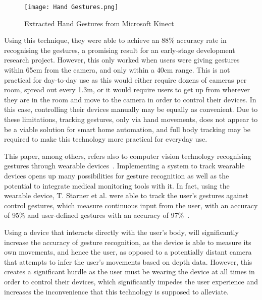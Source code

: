 \begin{figure}[!htb]
    \caption{Extracted Hand Gestures from Microsoft Kinect~\protect\cite{Desa17}}
    \centering
    \texttt{[image: Hand Gestures.png]}
    \label{fig:hand_gestures}
\end{figure}

Using this technique, they were able to achieve an 88\% accuracy rate in recognising the gestures, a promising result for an early-stage development research project.
However, this only worked when users were giving gestures within 65cm from the camera, and only within a 40cm range.
This is not practical for day-to-day use as this would either require dozens of cameras per room, spread out every 1.3m, or it would require users to get up from wherever they are in the room and move to the camera in order to control their devices.
In this case, controlling their devices manually may be equally as convenient.
Due to these limitations, tracking gestures, only via hand movements, does not appear to be a viable solution for smart home automation, and full body tracking may be required to make this technology more practical for everyday use.

This paper, among others, refers also to computer vision technology recognising gestures through wearable devices~\cite{Krum00,Star00,Vole22}.
Implementing a system to track wearable devices opens up many possibilities for gesture recognition as well as the potential to integrate medical monitoring tools with it.
In fact, using the wearable device, T. Starner et al. were able to track the user's gestures against control gestures, which measure continuous input from the user, with an accuracy of 95\% and user-defined gestures with an accuracy of 97\%~\cite{Star00}.

Using a device that interacts directly with the user's body, will significantly increase the accuracy of gesture recognition, as the device is able to measure its own movements, and hence the user, as opposed to a potentially distant camera that attempts to infer the user's movements based on depth data.
However, this creates a significant hurdle as the user must be wearing the device at all times in order to control their devices, which significantly impedes the user experience and increases the inconvenience that this technology is supposed to alleviate.

